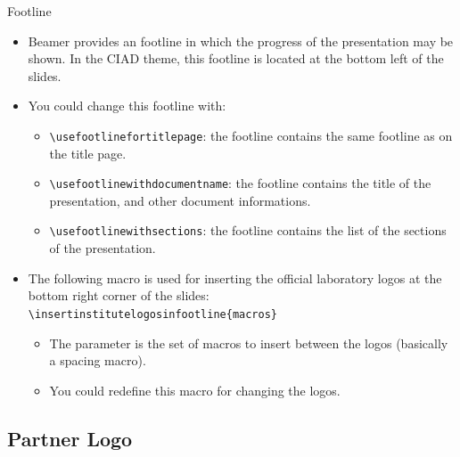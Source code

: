 \documentclass[english,sectioncirclenumberstyle]{ciadbeamer}
\begin{document}
\begin{frame}[t]{Footline}
	\begin{itemize}
	\item Beamer provides an footline in which the progress of the presentation may be shown.
	In the CIAD theme, this footline is located at the bottom left of the slides.
	\vspace{1em}
	\item You could change this footline with: \begin{itemize}
		\item \texttt{{\textbackslash}usefootlinefortitlepage}: the footline contains the same footline as on the title page.
		\item \texttt{{\textbackslash}usefootlinewithdocumentname}: the footline contains the title of the presentation, and other document informations.
		\item \texttt{{\textbackslash}usefootlinewithsections}: the footline contains the list of the sections of the presentation.
		\end{itemize}
	\vspace{1em}
	\item The following macro is used for inserting the official laboratory logos at the bottom right corner of the slides: \\
		\texttt{{\textbackslash}insertinstitutelogosinfootline\{macros\}}
		\begin{itemize}
		\item The parameter is the set of macros to insert between the logos (basically a spacing macro).
		\item You could redefine this macro for changing the logos.
		\end{itemize}
	\end{itemize}
\end{frame}

\subsection{Partner Logo}
\end{document}
